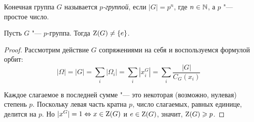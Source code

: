 \begin{definition}
	Конечная группа $G$ называется \textit{$p$-группой}, если $|G| = p^n$, где $n \in \mathbb{N}$, а $p$ "--- простое число.
\end{definition}

\begin{theorem}
	Пусть $G$ "--- $p$-группа. Тогда $\operatorname{Z}(G) \ne \{e\}$.
\end{theorem}

\begin{proof}
	Рассмотрим действие $G$ сопряжениями на себя и воспользуемся формулой орбит:
	\[|\Omega| = |G| = \sum\limits_i |\Omega_i| = \sum\limits_i |x_i^G| = \sum\limits_i \frac{|G|}{C_G(x_i)}\]
	
	Каждое слагаемое в последней сумме "--- это некоторая (возможно, нулевая) степень $p$. Поскольку левая часть кратна $p$, число слагаемых, равных единице, делится на $p$. Но $|x^G| = 1 \Leftrightarrow x \in \operatorname{Z}(G)$ и $e \in \operatorname{Z}(G)$, значит, $\operatorname{Z}(G) \geqslant p$.
\end{proof}